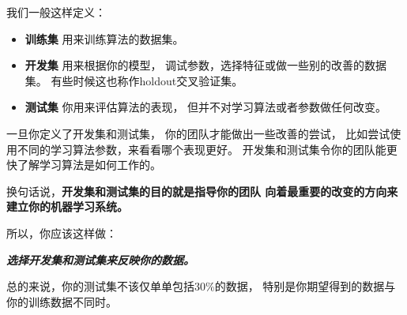 \iffalse
We usually define:
• Training set — Which you run your learning algorithm on.
• Dev (development) set — Which you use to tune parameters, select features, and
make other decisions regarding the learning algorithm. Sometimes also called the holdout cross validation set.
• Test set — which you use to evaluate the performance of the algorithm, but not to make
any decisions about regarding what learning algorithm or parameters to use.
One you define a dev set (development set) and test set, your team will try a lot of ideas, such
as different learning algorithm parameters, to see what works best. The dev and test sets
allow your team to quickly see how well your algorithm is doing.
In other words, the purpose of the dev and test sets are to direct your team toward
the most important changes to make to the machine learning system.
So, you should do the following:
Choose dev and test sets to reflect data you expect to get in the future
and want to do well on.
In order words, your test set should not simply be 30%
expect your future data (mobile app images) to be different in nature from your training set
(website images).
\fi

我们一般这样定义：
\begin{itemize}
	\item \textbf{训练集} 用来训练算法的数据集。
	\item \textbf{开发集} 用来根据你的模型，
	调试参数，选择特征或做一些别的改善的数据集。
	有些时候这也称作holdout交叉验证集。
	\item \textbf{测试集} 你用来评估算法的表现，
	但并不对学习算法或者参数做任何改变。
\end{itemize}

一旦你定义了开发集和测试集，
你的团队才能做出一些改善的尝试，
比如尝试使用不同的学习算法参数，来看看哪个表现更好。
开发集和测试集令你的团队能更快了解学习算法是如何工作的。

换句话说，\textbf{开发集和测试集的目的就是指导你的团队
	向着最重要的改变的方向来建立你的机器学习系统。}

所以，你应该这样做：

\textit{\textbf{选择开发集和测试集来反映你的数据。}}

总的来说，你的测试集不该仅单单包括30\%的数据，
特别是你期望得到的数据与你的训练数据不同时。

